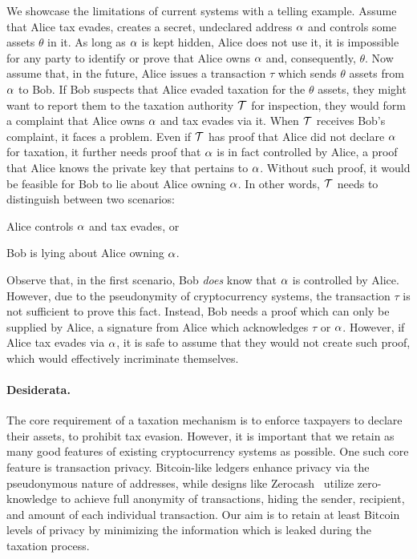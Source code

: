 We showcase the limitations of current systems with a telling example.  Assume
that Alice tax evades, \ie creates a secret, undeclared address $\alpha$ and
controls some assets $\theta$ in it. As long as $\alpha$ is kept hidden, \ie
Alice does not use it, it is impossible for any party to identify or prove that
Alice owns $\alpha$ and, consequently, $\theta$.
Now assume that, in the future, Alice issues a transaction $\tau$ which
sends $\theta$ assets from $\alpha$ to Bob. If Bob suspects that Alice evaded
taxation for the $\theta$ assets, they might want to report them to the
taxation authority $\mathcal{T}$ for inspection, \ie they would form a complaint
that Alice owns $\alpha$ and tax evades via it.
When $\mathcal{T}$ receives Bob's complaint, it faces a problem. Even if
$\mathcal{T}$ has proof that Alice did not declare $\alpha$ for taxation, it
further needs proof that $\alpha$ is in fact controlled by Alice, \ie a proof
that Alice knows the private key that pertains to $\alpha$. Without such
proof, it would be feasible for Bob to lie about Alice owning $\alpha$. In
other words, $\mathcal{T}$ needs to distinguish between two scenarios:
\begin{inparaenum}[i)]
    \item Alice controls $\alpha$ and tax evades, or
    \item Bob is lying about Alice owning $\alpha$.
\end{inparaenum}
Observe that, in the first scenario, Bob \emph{does} know that $\alpha$ is
controlled by Alice. However, due to the pseudonymity of cryptocurrency
systems, the transaction $\tau$ is not sufficient to prove this fact. Instead,
Bob needs a proof which can only be supplied by Alice, \eg a signature from
Alice which acknowledges $\tau$ or $\alpha$. However, if Alice tax evades via
$\alpha$, it is safe to assume that they would not create such proof, which
would effectively incriminate themselves.

\paragraph{Desiderata.}\label{subsec:desiderata}

The core requirement of a taxation mechanism is to enforce taxpayers to declare
their assets, \ie to prohibit tax evasion.  However, it is important that we
retain as many good features of existing cryptocurrency systems as possible.
One such core feature is transaction privacy. Bitcoin-like ledgers enhance
privacy via the pseudonymous nature of addresses, while designs like
Zerocash~\cite{SP:BCGGMT14} utilize zero-knowledge to achieve full anonymity of
transactions, \ie hiding the sender, recipient, and amount of each individual
transaction. Our aim is to retain at least Bitcoin levels of privacy by
minimizing the information which is leaked during the taxation process.


